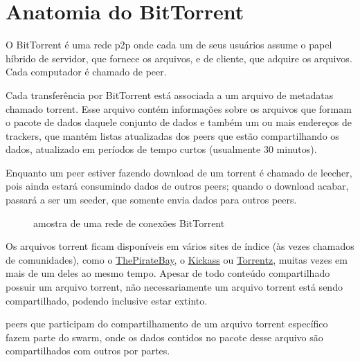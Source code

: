 
\chapter{Anatomia do BitTorrent}

O BitTorrent é uma rede \gls{p2p} onde cada um de seus usuários assume o papel híbrido
de servidor, que fornece os arquivos, e de cliente, que adquire os arquivos. Cada
computador é chamado de \gls{peer}.

Cada transferência por BitTorrent está associada a um arquivo de \glspl{metadata}
chamado \gls{torrent}. Esse arquivo contém informações sobre os arquivos que formam o
pacote de dados daquele conjunto de dados e também um ou mais endereços de
\glspl*{tracker}, que mantém listas atualizadas dos \glspl*{peer} que estão
compartilhando os dados, atualizado em períodos de tempo curtos (usualmente 30 minutos).

\begin{comment}
    \begin{figure}[H]
        \centering
        \fbox{\texttt{[image: funcionamento.png]}}
        \caption{esquema básico do funcionamento do BitTorrent}
        \label{fig:torrent-basics}
    \end{figure}
\end{comment}

Enquanto um \gls*{peer} estiver fazendo download de um \gls*{torrent} é chamado de
\gls{leecher}, pois ainda estará consumindo dados de outros \glspl*{peer}; quando o
download acabar, passará a ser um \gls{seeder}, que somente envia dados para outros
\glspl*{peer}.

\begin{figure}[ht]
    \centering
    \caption{amostra de uma rede de conexões BitTorrent}
    \label{fig:torrent-universo}
\end{figure}

Os arquivos \gls*{torrent} ficam disponíveis em vários sites de índice (às vezes
chamados de comunidades), como o \href{http://thepiratebay.sx/}{ThePirateBay}, o
\href{http://kickass.to/}{Kickass} ou \href{https://torrentz.eu/}{Torrentz}, muitas
vezes em mais de um deles ao mesmo tempo. Apesar de todo conteúdo compartilhado possuir
um arquivo \gls*{torrent}, não necessariamente um arquivo \gls*{torrent} está sendo
compartilhado, podendo inclusive estar extinto.

\Glspl*{peer} que participam do compartilhamento de um arquivo \gls*{torrent} específico
fazem parte do \gls{swarm}, onde os dados contidos no pacote desse arquivo são
compartilhados com outros por partes.


